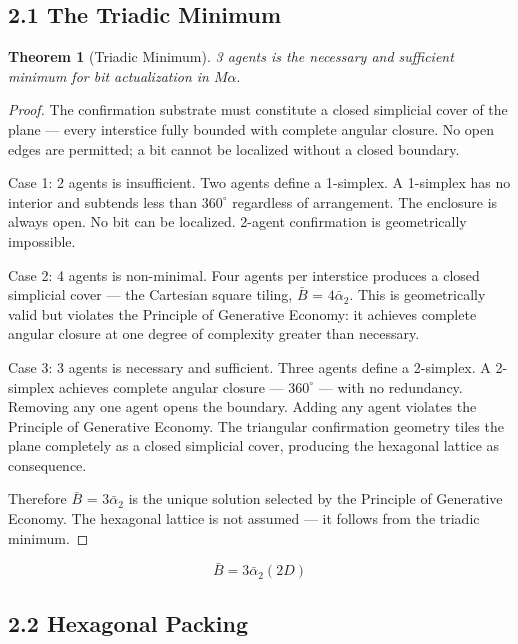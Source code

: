 \documentclass[11pt,oneside]{report}
\newtheorem{theorem}{Theorem}[section]
\theoremstyle{definition}
\theoremstyle{remark}
\begin{document}
\subsection*{2.1 The Triadic Minimum}

\begin{theorem}[Triadic Minimum]
3 agents is the necessary and sufficient
minimum for bit actualization in \ensuremath{M\alpha .}
\end{theorem}

\begin{proof}
The confirmation substrate must constitute a
closed simplicial cover of the plane --- every interstice fully bounded
with complete angular closure. No open edges are permitted; a bit cannot
be localized without a closed boundary.

Case 1: 2 agents is insufficient. Two agents define a 1-simplex. A
1-simplex has no interior and subtends less than \ensuremath{360^{\circ}} regardless of
arrangement. The enclosure is always open. No bit can be localized.
2-agent confirmation is geometrically impossible.

Case 2: 4 agents is non-minimal. Four agents per interstice produces a
closed simplicial cover --- the Cartesian square tiling, \ensuremath{\bar{B}} = \ensuremath{4\bar{\alpha}_{2}.} This
is geometrically valid but violates the Principle of Generative Economy:
it achieves complete angular closure at one degree of complexity greater
than necessary.

Case 3: 3 agents is necessary and sufficient. Three agents define a
2-simplex. A 2-simplex achieves complete angular closure --- \ensuremath{360^{\circ}} ---
with no redundancy. Removing any one agent opens the boundary. Adding
any agent violates the Principle of Generative Economy. The triangular
confirmation geometry tiles the plane completely as a closed simplicial
cover, producing the hexagonal lattice as consequence.

Therefore \ensuremath{\bar{B}} = \ensuremath{3\bar{\alpha}_{2}} is the unique solution selected by the Principle of
Generative Economy. The hexagonal lattice is not assumed --- it follows
from the triadic minimum.

\end{proof}

\begin{equation*}
\bar{B} = 3\bar{\alpha}_{2} (2D)
\end{equation*}

\subsection*{2.2 Hexagonal Packing}
\end{document}
